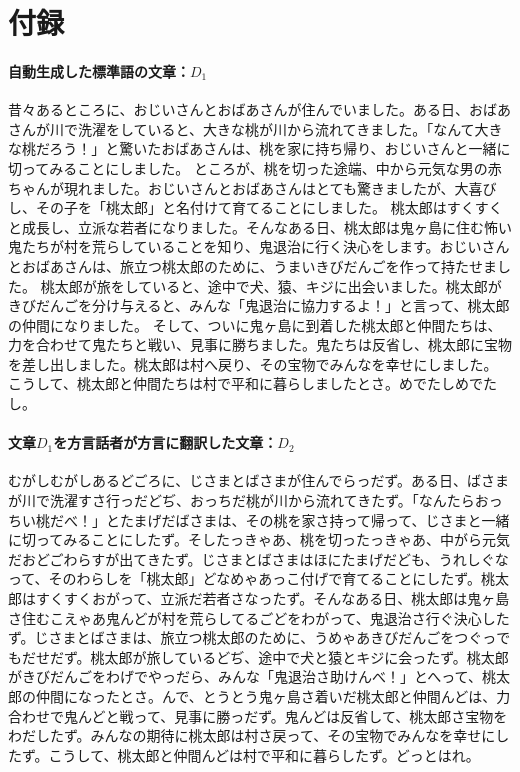 \section*{付録}
\paragraph{自動生成した標準語の文章：$D_1$}
昔々あるところに、おじいさんとおばあさんが住んでいました。ある日、おばあさんが川で洗濯をしていると、大きな桃が川から流れてきました。「なんて大きな桃だろう！」と驚いたおばあさんは、桃を家に持ち帰り、おじいさんと一緒に切ってみることにしました。 ところが、桃を切った途端、中から元気な男の赤ちゃんが現れました。おじいさんとおばあさんはとても驚きましたが、大喜びし、その子を「桃太郎」と名付けて育てることにしました。 桃太郎はすくすくと成長し、立派な若者になりました。そんなある日、桃太郎は鬼ヶ島に住む怖い鬼たちが村を荒らしていることを知り、鬼退治に行く決心をします。おじいさんとおばあさんは、旅立つ桃太郎のために、うまいきびだんごを作って持たせました。 桃太郎が旅をしていると、途中で犬、猿、キジに出会いました。桃太郎がきびだんごを分け与えると、みんな「鬼退治に協力するよ！」と言って、桃太郎の仲間になりました。 そして、ついに鬼ヶ島に到着した桃太郎と仲間たちは、力を合わせて鬼たちと戦い、見事に勝ちました。鬼たちは反省し、桃太郎に宝物を差し出しました。桃太郎は村へ戻り、その宝物でみんなを幸せにしました。 こうして、桃太郎と仲間たちは村で平和に暮らしましたとさ。めでたしめでたし。

\paragraph{文章$D_1$を方言話者が方言に翻訳した文章：$D_2$}
むがしむがしあるどごろに、じさまとばさまが住んでらっだず。ある日、ばさまが川で洗濯すさ行っだどぢ、おっちだ桃が川から流れてきたず。「なんたらおっちい桃だべ！」とたまげだばさまは、その桃を家さ持って帰って、じさまと一緒に切ってみることにしたず。そしたっきゃあ、桃を切ったっきゃあ、中がら元気だおどごわらすが出てきたず。じさまとばさまはほにたまげだども、うれしぐなって、そのわらしを「桃太郎」どなめゃあっこ付げで育てることにしたず。桃太郎はすくすくおがって、立派だ若者さなったず。そんなある日、桃太郎は鬼ヶ島さ住むこえゃあ鬼んどが村を荒らしてるごどをわがって、鬼退治さ行ぐ決心したず。じさまとばさまは、旅立つ桃太郎のために、うめゃあきびだんごをつぐっでもだせだず。桃太郎が旅しているどぢ、途中で犬と猿とキジに会ったず。桃太郎がきびだんごをわげでやっだら、みんな「鬼退治さ助けんべ！」とへって、桃太郎の仲間になったとさ。んで、とうとう鬼ヶ島さ着いだ桃太郎と仲間んどは、力合わせで鬼んどと戦って、見事に勝っだず。鬼んどは反省して、桃太郎さ宝物をわだしたず。みんなの期待に桃太郎は村さ戻って、その宝物でみんなを幸せにしたず。こうして、桃太郎と仲間んどは村で平和に暮らしたず。どっとはれ。

